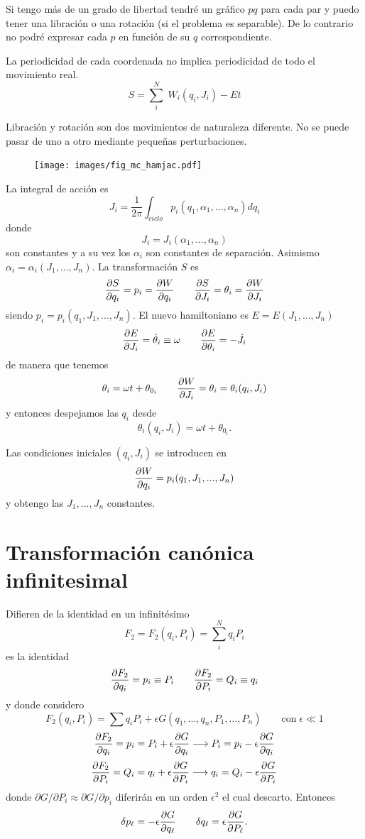 \documentclass[10pt,oneside]{CBFT_book}
\begin{document}
Si tengo más de un grado de libertad tendré un gráfico $pq$ para cada par y puedo tener una
libración o una rotación (si el problema es separable). De lo contrario no podré expresar
cada $p$ en función de su $q$ correspondiente.

La periodicidad de cada coordenada no implica periodicidad de todo el movimiento real.
\[
	S = \sum_i^N \; W_i(q_i,J_i) - Et
\]

Libración y rotación son dos movimientos de naturaleza diferente. No se puede pasar de
uno a otro mediante pequeñas perturbaciones.

\begin{figure}
	\begin{center}
	\texttt{[image: images/fig\_mc\_hamjac.pdf]}	 
	\end{center}
	\caption{}
\end{figure} 

La integral de acción es
\[
	J_i = \frac{1}{2\pi}\int_{ciclo} p_i(q_1,\alpha_1,...,\alpha_n) dq_i
\]
donde 
\[
	J_i = J_i(\alpha_1,...,\alpha_n)
\]
son constantes y a su vez los $\alpha_i$ son constantes de separación.
Asimismo $\alpha_i=\alpha_i(J_1,...,J_n)$. 
La transformación $S$ es 
\[
	\frac{\partial^{\hspace{-0.05em}} {S}}{\partial {q_i}^{\hspace{-0.05em}}} = p_i = \frac{\partial^{\hspace{-0.05em}} {W}}{\partial {q_i}^{\hspace{-0.05em}}} \qquad \frac{\partial^{\hspace{-0.05em}} {S}}{\partial {J_i}^{\hspace{-0.05em}}} = \theta_i = \frac{\partial^{\hspace{-0.05em}} {W}}{\partial {J_i}^{\hspace{-0.05em}}}
\]
siendo $p_i = p_i(q_1,J_1,...,J_n)$.
El nuevo hamiltoniano es $E=E(J_1,...,J_n)$
\[
	\frac{\partial^{\hspace{-0.05em}} {E}}{\partial {J_i}^{\hspace{-0.05em}}} = \dot{\theta}_i \equiv \omega \qquad \frac{\partial^{\hspace{-0.05em}} {E}}{\partial {\theta_i}^{\hspace{-0.05em}}} = -\dot{J}_i
\]
de manera que tenemos
\[
	\theta_i = \omega t + \theta_{0_i} \qquad  \frac{\partial^{\hspace{-0.05em}} {W}}{\partial {J_i}^{\hspace{-0.05em}}} = \theta_i = \theta_i(q_i, J_i)
\]
y entonces despejamos las $q_i$ desde
\[
	\theta_i(q_i, J_i) = \omega t + \theta_{0_i}.
\]

Las condiciones iniciales $(q_i, J_i)$ se introducen en
\[
	\frac{\partial^{\hspace{-0.05em}} {W}}{\partial {q_i}^{\hspace{-0.05em}}} = p_i(q_1,J_1,...,J_n)
\]
y obtengo las $J_1, ..., J_n$ constantes.

\section{Transformación canónica infinitesimal}

Difieren de la identidad en un infinitésimo
\[
	F_2 = 	F_2(q_i,P_i) = \sum_i^N q_iP_i
\]
es la identidad
\[
	\frac{\partial^{\hspace{-0.05em}} {F_2}}{\partial {q_i}^{\hspace{-0.05em}}} =  p_i \equiv P_i \qquad \frac{\partial^{\hspace{-0.05em}} {F_2}}{\partial {P_i}^{\hspace{-0.05em}}} =  Q_i \equiv q_i
\]
y donde considero
\[
	F_2(q_i,P_i) = \sum q_i P_i + \epsilon G(q_1,...,q_n,P_1,...,P_n) \qquad \textrm{con} \; \epsilon \ll 1
\]
\[
	\frac{\partial^{\hspace{-0.05em}} {F_2}}{\partial {q_i}^{\hspace{-0.05em}}} = p_i = P_i + \epsilon\frac{\partial^{\hspace{-0.05em}} {G}}{\partial {q_i}^{\hspace{-0.05em}}} \longrightarrow P_i = p_i - \epsilon\frac{\partial^{\hspace{-0.05em}} {G}}{\partial {q_i}^{\hspace{-0.05em}}} 
\]
\[
	\frac{\partial^{\hspace{-0.05em}} {F_2}}{\partial {P_i}^{\hspace{-0.05em}}} = Q_i = q_i + \epsilon\frac{\partial^{\hspace{-0.05em}} {G}}{\partial {P_i}^{\hspace{-0.05em}}} \longrightarrow q_i = Q_i - \epsilon\frac{\partial^{\hspace{-0.05em}} {G}}{\partial {P_i}^{\hspace{-0.05em}}} 	
\]
donde $\partial G/\partial P_i \approx \partial G/\partial p_i$ diferirán en un orden $\epsilon^2$ el cual
descarto. Entonces
\[
	\delta p_\ell = -\epsilon \frac{\partial^{\hspace{-0.05em}} {G}}{\partial {q_\ell}^{\hspace{-0.05em}}} \qquad \delta q_\ell = \epsilon \frac{\partial^{\hspace{-0.05em}} {G}}{\partial {P_\ell}^{\hspace{-0.05em}}}.
\]
\end{document}
